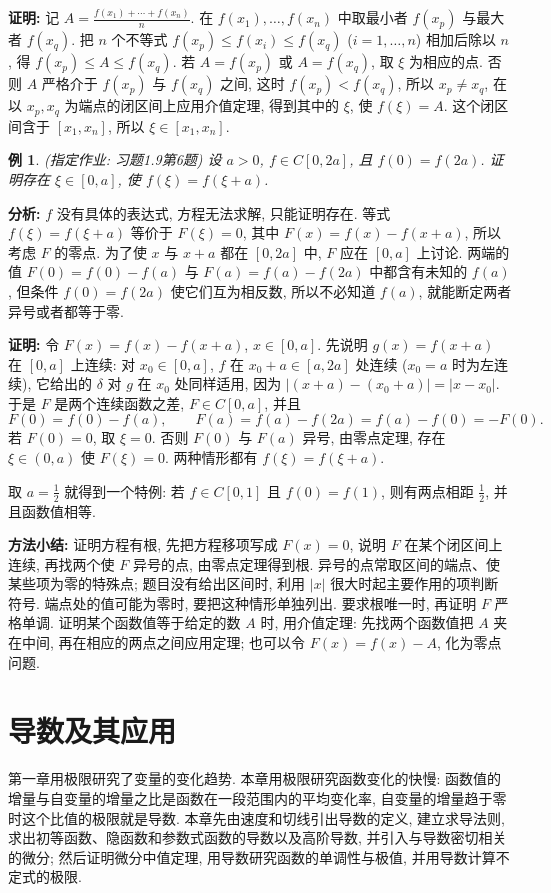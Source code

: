 \documentclass[UTF8,openany]{ctexbook}
\theoremstyle{chinesetextbook}
\newtheorem{example}{例}[section]
\newenvironment{cnproof}{\par\indent\textbf{证明:} \ignorespaces}{\par}
\begin{document}
\begin{cnproof}
记 $\displaystyle A=\frac{f(x_1)+\cdots+f(x_n)}n$. 在 $f(x_1),\ldots,f(x_n)$ 中取最小者 $f(x_p)$ 与最大者 $f(x_q)$. 把 $n$ 个不等式 $f(x_p)\le f(x_i)\le f(x_q)$ ($i=1,\ldots,n$) 相加后除以 $n$, 得 $f(x_p)\le A\le f(x_q)$. 若 $A=f(x_p)$ 或 $A=f(x_q)$, 取 $\xi$ 为相应的点. 否则 $A$ 严格介于 $f(x_p)$ 与 $f(x_q)$ 之间, 这时 $f(x_p)<f(x_q)$, 所以 $x_p\ne x_q$, 在以 $x_p,x_q$ 为端点的闭区间上应用介值定理, 得到其中的 $\xi$, 使 $f(\xi)=A$. 这个闭区间含于 $[x_1,x_n]$, 所以 $\xi\in[x_1,x_n]$.
\end{cnproof}
\begin{example}
\textnormal{(指定作业: 习题1.9第6题)} 设 $a>0$, $f\in C[0,2a]$, 且 $f(0)=f(2a)$. 证明存在 $\xi\in[0,a]$, 使 $f(\xi)=f(\xi+a)$.
\end{example}
\par\indent\textbf{分析:} $f$ 没有具体的表达式, 方程无法求解, 只能证明存在. 等式 $f(\xi)=f(\xi+a)$ 等价于 $F(\xi)=0$, 其中 $F(x)=f(x)-f(x+a)$, 所以考虑 $F$ 的零点. 为了使 $x$ 与 $x+a$ 都在 $[0,2a]$ 中, $F$ 应在 $[0,a]$ 上讨论. 两端的值 $F(0)=f(0)-f(a)$ 与 $F(a)=f(a)-f(2a)$ 中都含有未知的 $f(a)$, 但条件 $f(0)=f(2a)$ 使它们互为相反数, 所以不必知道 $f(a)$, 就能断定两者异号或者都等于零.
\begin{cnproof}
令 $F(x)=f(x)-f(x+a)$, $x\in[0,a]$. 先说明 $g(x)=f(x+a)$ 在 $[0,a]$ 上连续: 对 $x_0\in[0,a]$, $f$ 在 $x_0+a\in[a,2a]$ 处连续 ($x_0=a$ 时为左连续), 它给出的 $\delta$ 对 $g$ 在 $x_0$ 处同样适用, 因为 $|(x+a)-(x_0+a)|=|x-x_0|$. 于是 $F$ 是两个连续函数之差, $F\in C[0,a]$, 并且
\[
F(0)=f(0)-f(a),\qquad F(a)=f(a)-f(2a)=f(a)-f(0)=-F(0).
\]
若 $F(0)=0$, 取 $\xi=0$. 否则 $F(0)$ 与 $F(a)$ 异号, 由零点定理, 存在 $\xi\in(0,a)$ 使 $F(\xi)=0$. 两种情形都有 $f(\xi)=f(\xi+a)$.
\end{cnproof}
取 $\displaystyle a=\frac12$ 就得到一个特例: 若 $f\in C[0,1]$ 且 $f(0)=f(1)$, 则有两点相距 $\displaystyle\frac12$, 并且函数值相等.

\par\indent\textbf{方法小结:} 证明方程有根, 先把方程移项写成 $F(x)=0$, 说明 $F$ 在某个闭区间上连续, 再找两个使 $F$ 异号的点, 由零点定理得到根. 异号的点常取区间的端点、使某些项为零的特殊点; 题目没有给出区间时, 利用 $|x|$ 很大时起主要作用的项判断符号. 端点处的值可能为零时, 要把这种情形单独列出. 要求根唯一时, 再证明 $F$ 严格单调. 证明某个函数值等于给定的数 $A$ 时, 用介值定理: 先找两个函数值把 $A$ 夹在中间, 再在相应的两点之间应用定理; 也可以令 $F(x)=f(x)-A$, 化为零点问题.
\chapter{导数及其应用}
第一章用极限研究了变量的变化趋势. 本章用极限研究函数变化的快慢: 函数值的增量与自变量的增量之比是函数在一段范围内的平均变化率, 自变量的增量趋于零时这个比值的极限就是导数. 本章先由速度和切线引出导数的定义, 建立求导法则, 求出初等函数、隐函数和参数式函数的导数以及高阶导数, 并引入与导数密切相关的微分; 然后证明微分中值定理, 用导数研究函数的单调性与极值, 并用导数计算不定式的极限.
\end{document}
